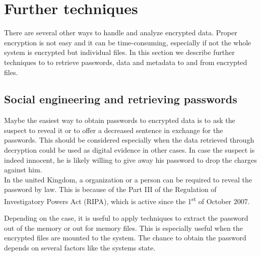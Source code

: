 \section{Further techniques}
There are several other ways to handle and analyze encrypted data. Proper encryption is not easy and it can be time-consuming, especially if not the whole system is encrypted but individual files. In this section we describe further techniques to to retrieve passwords, data and metadata to and from encrypted files.
\subsection{Social engineering and retrieving passwords}
Maybe the easiest way to obtain passwords to encrypted data is to ask the suspect to reveal it or to offer a decreased sentence in exchange for the passwords.
This should be considered especially when the data retrieved through decryption could be used as digital evidence in other cases.
In case the suspect is indeed innocent, he is likely willing to give away his password to drop the charges against him.\\
In the united Kingdom, a organization or a person can be required to reveal the password by law. This is because of the Part III of the Regulation of Investigatory Powers Act (RIPA), which is active since  the 1\textsuperscript{st} of October 2007.\cite{TheEffectOfFileAndDiskEncryption}

Depending on the case, it is useful to apply techniques to extract the password out of the memory or out for memory files. This is especially useful when the encrypted files are mounted to the system. The chance to obtain the password depends on several factors like the systems state.\cite{MaartmannMoe2009S132}

